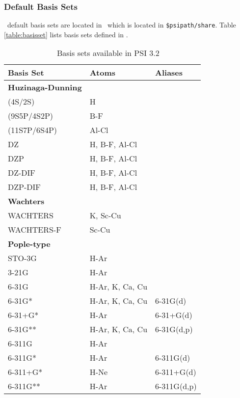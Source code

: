 \subsubsection{Default Basis Sets}
\PSIthree\ default basis sets are located in \pbasisdat\ which is located in
{\tt \$psipath/share}. Table \ref{table:basisset} lists basis sets
defined in \pbasisdat.

\begin{table}[tbp]
\caption{~~~Basis sets available in PSI 3.2}

\begin{center}
\begin{tabular}{|l|l|l|}
\hline
\hline
\hline
Basis Set 		&Atoms   	&Aliases\\ 
\hline
\hline
\textbf{Huzinaga-Dunning}		&				&\\
\hline
	(4S/2S)			& H				&\\
	(9S5P/4S2P)		& B-F				&\\
	(11S7P/6S4P)		& Al-Cl			&\\
	DZ			& H, B-F, Al-Cl		&\\
	DZP			& H, B-F, Al-Cl			&\\
	DZ-DIF			& H, B-F, Al-Cl		&\\
	DZP-DIF			& H, B-F, Al-Cl		&\\
\hline
\hline
\textbf{Wachters}			&				&\\
\hline
	WACHTERS		& K, Sc-Cu			&\\
	WACHTERS-F		& Sc-Cu			&\\
\hline
\hline
\textbf{Pople-type}		&				&\\
\hline
	STO-3G			& H-Ar			&\\
	3-21G			& H-Ar			&\\
	6-31G			& H-Ar, K, Ca, Cu	&\\
        6-31G*                  & H-Ar, K, Ca, Cu       &6-31G(d)\\
        6-31+G*                 & H-Ar                  &6-31+G(d)\\
        6-31G**                 & H-Ar, K, Ca, Cu       &6-31G(d,p)\\
	6-311G			& H-Ar			&\\
	6-311G*                 & H-Ar                  &6-311G(d)\\
        6-311+G*                & H-Ne                  &6-311+G(d)\\
	6-311G**                & H-Ar                  &6-311G(d,p)\\

\end{tabular}
\end{center}
\end{table}
